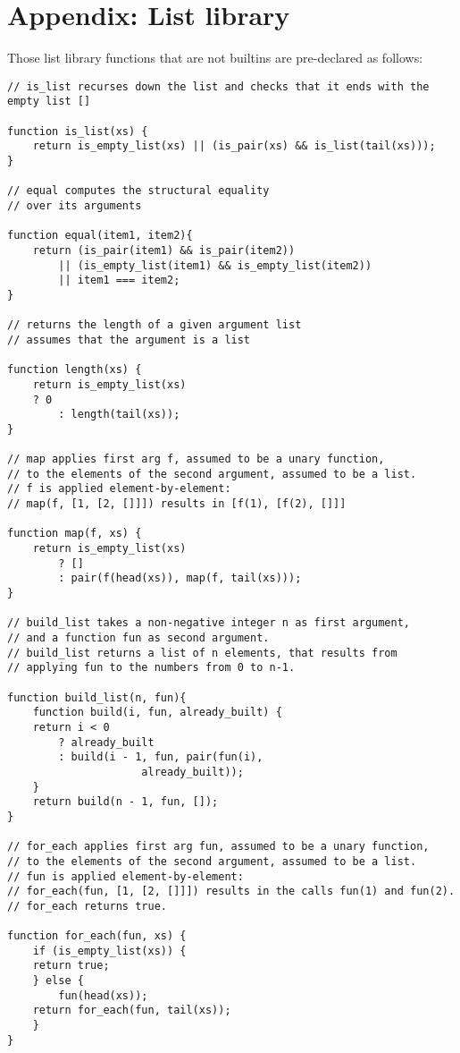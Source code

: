 \section*{Appendix: List library}

Those list library functions that are not builtins are pre-declared as follows:

\begin{lstlisting}
// is_list recurses down the list and checks that it ends with the empty list []

function is_list(xs) {
    return is_empty_list(xs) || (is_pair(xs) && is_list(tail(xs)));
}

// equal computes the structural equality 
// over its arguments

function equal(item1, item2){
    return (is_pair(item1) && is_pair(item2))
        || (is_empty_list(item1) && is_empty_list(item2))
        || item1 === item2;
}

// returns the length of a given argument list
// assumes that the argument is a list

function length(xs) {
    return is_empty_list(xs) 
	? 0
        : length(tail(xs));
}

// map applies first arg f, assumed to be a unary function,
// to the elements of the second argument, assumed to be a list.
// f is applied element-by-element: 
// map(f, [1, [2, []]]) results in [f(1), [f(2), []]]

function map(f, xs) {
    return is_empty_list(xs)
        ? []
        : pair(f(head(xs)), map(f, tail(xs)));
}

// build_list takes a non-negative integer n as first argument,
// and a function fun as second argument.
// build_list returns a list of n elements, that results from 
// applying fun to the numbers from 0 to n-1.

function build_list(n, fun){
    function build(i, fun, already_built) {
	return i < 0
	    ? already_built
	    : build(i - 1, fun, pair(fun(i),
		  		     already_built));
    }
    return build(n - 1, fun, []);
}

// for_each applies first arg fun, assumed to be a unary function,
// to the elements of the second argument, assumed to be a list.
// fun is applied element-by-element:
// for_each(fun, [1, [2, []]]) results in the calls fun(1) and fun(2).
// for_each returns true.

function for_each(fun, xs) {
    if (is_empty_list(xs)) {
	return true;
    } else {
        fun(head(xs));
	return for_each(fun, tail(xs));
    }
}


\end{lstlisting}
